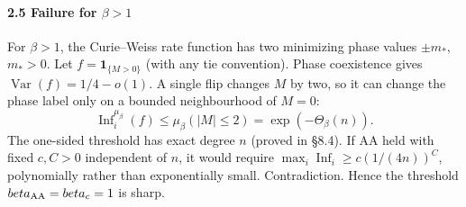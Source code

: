 \paragraph{\texorpdfstring{2.5 Failure for \(\beta>1\)}{2.5 Failure for \textbackslash beta\textgreater1}}\label{failure-for-beta1}

For \(\beta>1\), the Curie--Weiss rate function has two minimizing phase values \(\pm m_*\), \(m_*>0\). Let \(f=\mathbf1_{\{M>0\}}\) (with any tie convention). Phase coexistence gives \(\operatorname{Var}(f)=1/4-o(1)\). A single flip changes \(M\) by two, so it can change the phase label only on a bounded neighbourhood of \(M=0\):
\[\operatorname{Inf}_i^{\mu_\beta}(f)\le\mu_\beta(|M|\le2)
=\exp(-\Theta_\beta(n)).\]
The one-sided threshold has exact degree \(n\) (proved in §8.4). If AA held with fixed \(c,C>0\) independent of \(n\), it would require \(\max_i\operatorname{Inf}_i\ge c(1/(4n))^C\), polynomially rather than exponentially small. Contradiction. Hence the threshold \(\beta_{\rm AA}=\beta_c=1\) is sharp.
